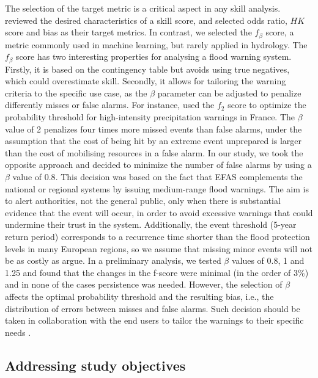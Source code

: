 \documentclass{ametsocV6.1}
\begin{document}
The selection of the target metric is a critical aspect in any skill analysis. \citet{Bartholmes2009} reviewed the desired characteristics of a skill score, and selected odds ratio, $HK$ score and bias as their target metrics. In contrast, we selected the $f_{\beta}$ score, a metric commonly used in machine learning, but rarely applied in hydrology. The $f_{\beta}$ score has two interesting properties for analysing a flood warning system. Firstly, it is based on the contingency table but avoids using true negatives, which could overestimate skill. Secondly, it allows for tailoring the warning criteria to the specific use case, as the $\beta$ parameter can be adjusted to penalize differently misses or false alarms. For instance, \citet{Bouttier2024} used the $f_2$ score to optimize the probability threshold for high-intensity precipitation warnings in France. The $\beta$ value of 2 penalizes four times more missed events than false alarms, under the assumption that the cost of  being hit by an extreme event unprepared is larger than the cost of mobilising resources in a false alarm. In our study, we took the opposite approach and decided to minimize the number of false alarms by using a $\beta$ value of $0.8$. This decision was based on the fact that EFAS complements the national or regional systems by issuing medium-range flood warnings. The aim is to alert authorities, not the general public, only when there is substantial evidence that the event will occur, in order to avoid excessive warnings that could undermine their trust in the system. Additionally, the event threshold (5-year return period) corresponds to a recurrence time shorter than the flood protection levels in many European regions, so we assume that missing minor events will not be as costly as \citet{Bouttier2024} argue. In a preliminary analysis, we tested $\beta$ values of 0.8, 1 and 1.25 and found that the changes in the f-score were minimal (in the order of 3\%) and in none of the cases persistence was needed. However, the selection of $\beta$ affects the optimal probability threshold and the resulting bias, i.e., the distribution of errors between misses and false alarms. Such decision should be taken in collaboration with the end users to tailor the warnings to their specific needs \citep{Lavers2020, Dasgupta2023}.

\subsection{Addressing study objectives}
\label{disc:objectives}
\end{document}
